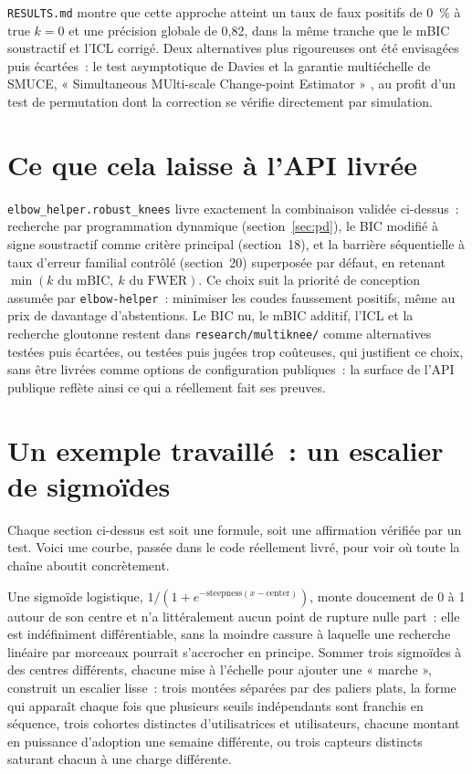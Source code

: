 \documentclass[11pt]{article}
\newcommand{\code}[1]{\texttt{#1}}
\begin{document}
\code{RESULTS.md} montre que cette approche atteint un taux de faux
positifs de 0~\% à $\text{true } k = 0$ et une précision globale de 0,82,
dans la même tranche que le mBIC soustractif et l'ICL corrigé. Deux
alternatives plus rigoureuses ont été envisagées puis écartées~: le test
asymptotique de Davies \citeyearpar{davies1977} et la garantie multiéchelle
de SMUCE, « Simultaneous MUlti-scale Change-point Estimator »
\citep{frick2014}, au profit d'un test de permutation dont la correction se
vérifie directement par simulation.

\section{Ce que cela laisse à l'API livrée}

\code{elbow\_helper.robust\_knees} livre exactement la combinaison validée
ci-dessus~: recherche par programmation dynamique (section~\ref{sec:pd}),
le BIC modifié à signe soustractif comme critère principal (section~18), et
la barrière séquentielle à taux d'erreur familial contrôlé (section~20)
superposée par défaut, en retenant $\min(k \text{ du mBIC},\ k \text{ du
FWER})$. Ce choix suit la priorité de conception assumée par
\code{elbow-helper}~: minimiser les coudes faussement positifs, même au
prix de davantage d'abstentions. Le BIC nu, le mBIC additif, l'ICL et la
recherche gloutonne restent dans \code{research/multiknee/} comme
alternatives testées puis écartées, ou testées puis jugées trop coûteuses,
qui justifient ce choix, sans être livrées comme options de configuration
publiques~: la surface de l'API publique reflète ainsi ce qui a réellement
fait ses preuves.

\section{Un exemple travaillé~: un escalier de sigmoïdes}

Chaque section ci-dessus est soit une formule, soit une affirmation
vérifiée par un test. Voici une courbe, passée dans le code réellement
livré, pour voir où toute la chaîne aboutit concrètement.

Une sigmoïde logistique, $1/(1+e^{-\text{steepness}(x-\text{center})})$,
monte doucement de 0 à 1 autour de son centre et n'a littéralement aucun
point de rupture nulle part~: elle est indéfiniment différentiable, sans la
moindre cassure à laquelle une recherche linéaire par morceaux pourrait
s'accrocher en principe. Sommer trois sigmoïdes à des centres différents,
chacune mise à l'échelle pour ajouter une « marche », construit un
escalier lisse~: trois montées séparées par des paliers plats, la forme qui
apparaît chaque fois que plusieurs seuils indépendants sont franchis en
séquence, trois cohortes distinctes d'utilisatrices et utilisateurs,
chacune montant en puissance d'adoption une semaine différente, ou trois
capteurs distincts saturant chacun à une charge différente.
\end{document}
